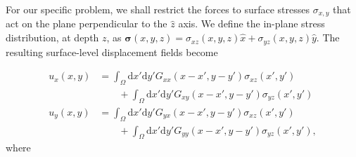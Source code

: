 \documentclass[aps,prl,reprint,twocolumn,groupedaddress,showpacs]{revtex4-1}
\def\dd{\mbox{d}}
\def\r{{\bf r}}
\def\u{{\bf u}}
\def\F{{\bf F}}
\def\F{{\bf F}}
\newcommand{\bs}{\boldsymbol{\sigma}}
\begin{document}

%
%
%
% 

% 

For our specific problem, we shall restrict the forces to surface
stresses $\sigma_{x,y}$ that act on the plane perpendicular to the
$\hat{z}$ axis. We define the in-plane stress distribution, at depth $z$, as
$\bs(x,y,z) = \sigma_{xz}(x,y,z)\hat{x} + \sigma_{yz}(x,y,z)\hat{y}$. 
The resulting surface-level displacement fields become

\begin{align}
u_{x}(x,y) &= \int_\Omega \dd x'\dd y'G_{xx}(x-x',y-y')\sigma_{xz}(x',y') \nonumber\\
&\qquad +  \int_\Omega \dd x'\dd y'G_{xy}(x-x',y-y')\sigma_{yz}(x',y') \label{eq:UMODEL1x}  \\
u_y(x,y) &= \int_\Omega \dd x'\dd y'G_{yx}(x-x',y-y')\sigma_{xz}(x',y') \nonumber\\
&\qquad +  \int_\Omega \dd x'\dd y'G_{yy}(x-x',y-y')\sigma_{yz}(x',y'),  \label{eq:UMODEL1y}  
\end{align}
%
where
\end{document}
